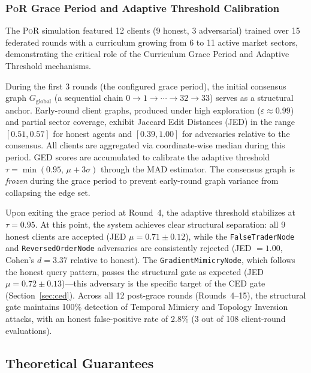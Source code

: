 \documentclass[journal]{IEEEtran}
\newcommand{\por}{\textsc{PoR}}
\begin{document}
\subsubsection{\por{} Grace Period and Adaptive Threshold Calibration}

The \por{} simulation featured 12 clients (9 honest, 3 adversarial) trained over
15 federated rounds with a curriculum growing from 6 to 11 active market
sectors, demonstrating the critical role of the Curriculum Grace Period and
Adaptive Threshold mechanisms.

During the first 3 rounds (the configured grace period), the initial consensus
graph $G_{\text{global}}$ (a sequential chain $0 \to 1 \to \cdots \to 32 \to
33$) serves as a structural anchor. Early-round client graphs, produced under
high exploration ($\varepsilon \approx 0.99$) and partial sector coverage,
exhibit Jaccard Edit Distances (JED) in the range $[0.51, 0.57]$ for honest
agents and $[0.39, 1.00]$ for adversaries relative to the consensus. All
clients are aggregated via coordinate-wise median during this period. GED
scores are accumulated to calibrate the adaptive threshold
$\tau = \min(0.95,\, \mu + 3\sigma)$ through the MAD estimator. The consensus
graph is \emph{frozen} during the grace period to prevent early-round graph
variance from collapsing the edge set.

Upon exiting the grace period at Round~4, the adaptive threshold stabilizes at
$\tau = 0.95$. At this point, the system achieves clear structural separation:
all 9 honest clients are accepted (JED $\mu = 0.71 \pm 0.12$), while the
\texttt{FalseTraderNode} and \texttt{ReversedOrderNode} adversaries are
consistently rejected (JED $= 1.00$, Cohen's $d = 3.37$ relative to honest).
The \texttt{GradientMimicryNode}, which follows the honest query pattern,
passes the structural gate as expected (JED $\mu = 0.72 \pm 0.13$)---this
adversary is the specific target of the CED gate (Section~\ref{sec:ced}).
Across all 12 post-grace rounds (Rounds~4--15), the structural gate maintains
100\% detection of Temporal Mimicry and Topology Inversion attacks, with an
honest false-positive rate of 2.8\% (3 out of 108 client-round evaluations).

\subsection{Theoretical Guarantees}
\label{sec:theorems}
\end{document}
